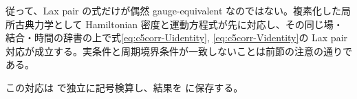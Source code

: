 従って、Lax pair の式だけが偶然 gauge-equivalent なのではない。複素化した局所古典力学として Hamiltonian 密度と運動方程式が先に対応し、その同じ場・結合・時間の辞書の上で式\eqref{eq:c5corr-Uidentity}, \eqref{eq:c5corr-Videntity}の Lax pair 対応が成立する。実条件と周期境界条件が一致しないことは前節の注意の通りである。

この対応は  で独立に記号検算し、結果を  に保存する。
